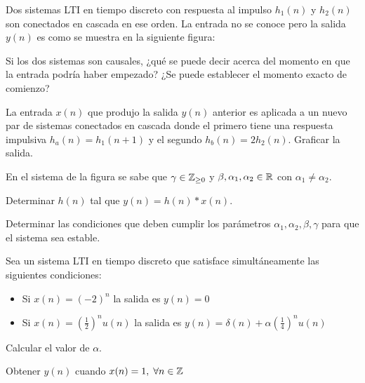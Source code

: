 \begin{ejercicio}
    Dos sistemas LTI en tiempo discreto con respuesta al impulso $h_1(n)$ y $h_2(n)$ son conectados en cascada en ese orden. La entrada no se conoce pero la salida $y(n)$ es como se muestra en la siguiente figura:
    \begin{center}
        
    \end{center}
    
    \inciso Si los dos sistemas son causales, ¿qué se puede decir acerca del momento en que la entrada podría haber empezado? ¿Se puede establecer el momento exacto de comienzo?
    
    \inciso La entrada $x(n)$ que produjo la salida $y(n)$ anterior es aplicada a un nuevo par de sistemas conectados en cascada donde el primero tiene una respuesta impulsiva $h_a(n) = h_1(n + 1)$ y el segundo $h_b(n) = 2h_2(n)$. Graficar la salida.
\end{ejercicio}
    
\begin{ejercicio}
    En el sistema de la figura se sabe que $\gamma \in \mathbb{Z}_{\geq 0}$ y $\beta, \alpha_1, \alpha_2 \in \mathbb{R}$ con $\alpha_1 \neq \alpha_2$.
    \begin{center}
        
    \end{center}

    \inciso Determinar $h(n)$ tal que $y(n) = h(n) * x(n)$.

    \inciso Determinar las condiciones que deben cumplir los parámetros $\alpha_1, \alpha_2, \beta, \gamma$ para que el sistema sea estable.
\end{ejercicio}

\begin{ejercicio}
    Sea un sistema LTI en tiempo discreto que satisface simultáneamente las siguientes condiciones:
    \begin{itemize}
        \item Si $x(n) = (-2)^n$ la salida es $y(n)=0$
        \item Si $x(n) = \left(\frac{1}{2}\right)^n u(n)$ la salida es $y(n) = \delta(n) + \alpha \left(\frac{1}{4}\right)^n u(n)$
    \end{itemize}
    \inciso Calcular el valor de $\alpha$.
    
    \inciso Obtener $y(n)$ cuando $x(n) = 1,\; \forall n \in \mathbb{Z}$
\end{ejercicio}

